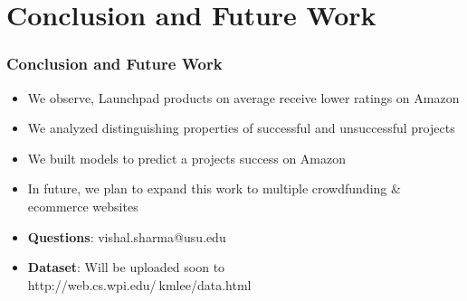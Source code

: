 \documentclass[9pt]{beamer}
\begin{document}
\begin{comment}
\begin{frame}
\frametitle{Random Forest Analysis}
\begin{itemize}[label=\textcolor{blue}{\textbullet}]
	\item{Most feature importance algorithms do not express (+/-)}
	\item{Partial Dependence Plot help understand features affecting model (+,-)}
	\item{We analyze all independent variables and choose 4 affecting the model negatively}
	\item{\# created projects, \# of followers, \# of rewards, Pledged money}
\end{itemize}
\centering
\texttt{[image: ./images/pdp.pdf]}

Removing them and retraining model increased accuracy to 0.761
\end{frame}
\end{comment}


\section{Conclusion and Future Work}
\begin{frame}
\frametitle{Conclusion and Future Work}
\begin{itemize}[label=\textcolor{blue}{\textbullet}]
	\item{We observe, Launchpad products on average receive lower ratings on Amazon}
	\item{We analyzed distinguishing properties of successful and unsuccessful projects}
	\item{We built models to predict a projects success on Amazon}
	\item{In future, we plan to expand this work to multiple crowdfunding \& ecommerce websites}	
	\vspace{20pt}
	\item{\textbf{Questions}: vishal.sharma@usu.edu}	
	\item{\textbf{Dataset}: Will be uploaded soon to \\ http://web.cs.wpi.edu/$~$kmlee/data.html}	
\end{itemize}
\end{frame}
\end{document}
